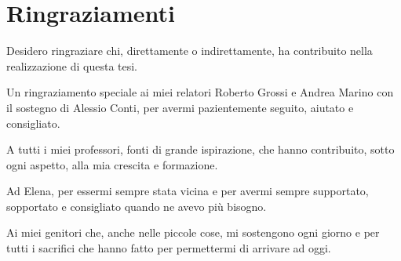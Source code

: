 

\chapter*{Ringraziamenti}


Desidero ringraziare chi, direttamente o indirettamente, ha contribuito nella realizzazione di questa tesi.\medskip

Un ringraziamento speciale ai miei relatori Roberto Grossi e Andrea Marino con il sostegno di Alessio Conti, per avermi pazientemente seguito, aiutato e consigliato.\medskip

A tutti i miei professori, fonti di grande ispirazione, che hanno contribuito, sotto ogni aspetto, alla mia crescita e formazione.\medskip

Ad Elena, per essermi sempre stata vicina e per avermi sempre supportato, sopportato e consigliato quando ne avevo più bisogno.\medskip

Ai miei genitori che, anche nelle piccole cose, mi sostengono ogni giorno e per tutti i sacrifici che hanno fatto per permettermi di arrivare ad oggi.\medskip

\noindent

\clearpage